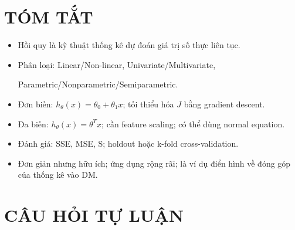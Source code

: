 \documentclass[10pt]{article}
\begin{document}
\section{TÓM TẮT}

\begin{itemize}
    \item Hồi quy là kỹ thuật thống kê dự đoán giá trị số thực liên tục.
    \item Phân loại: Linear/Non-linear, Univariate/Multivariate, 
    
    Parametric/Nonparametric/Semiparametric.
    \item Đơn biến: $h_\theta(x) = \theta_0 + \theta_1 x$; tối thiểu hóa $J$ bằng gradient descent.
    \item Đa biến: $h_\theta(x) = \theta^T x$; cần feature scaling; có thể dùng normal equation.
    \item Đánh giá: SSE, MSE, S; holdout hoặc k-fold cross-validation.
    \item Đơn giản nhưng hữu ích; ứng dụng rộng rãi; là ví dụ điển hình về đóng góp của thống kê vào DM.
\end{itemize}

\newpage
\section{CÂU HỎI TỰ LUẬN}
\end{document}
